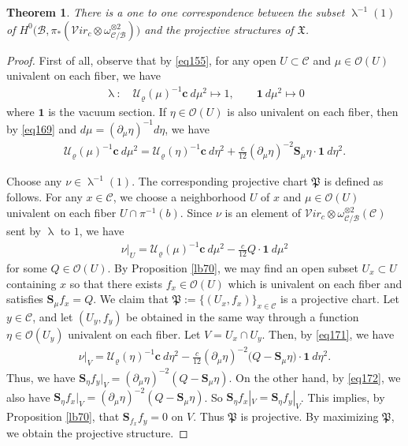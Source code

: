 \documentclass[12pt,a4paper,notitlepage]{report}
\theoremstyle{definition}
\theoremstyle{plain}
\newtheorem{thm}[df]{Theorem}
\newcommand{\fk}{\mathfrak}
\newcommand{\mc}{\mathcal}
\newcommand{\id}{\mathbf{1}}
\newcommand{\scr}{\mathscr}
\newcommand{\cbf}{\mathbf c}
\newcommand{\svir}{\mathcal V\!\mathit{ir}}
\newcommand{\Sbf}{\mathbf{S}}
\numberwithin{equation}{section}
\begin{document}
\begin{thm}\label{lb72}
There is a one to one correspondence between the subset $\uplambda^{-1}(1)$ of $H^0\big(\mc B,\pi_*(\svir_c\otimes \omega_{\mc C/\mc B}^{\otimes 2})\big)$ and  the projective structures of $\fk X$.
\end{thm}

\begin{proof}
First of all, observe that by \eqref{eq155}, for any open $U\subset \mc C$ and $\mu\in\scr O(U)$ univalent on each fiber, we have
\begin{gather*}
\uplambda:\quad \mc U_\varrho(\mu)^{-1}\cbf ~d\mu^2\mapsto 1,\qquad \id ~d\mu^2\mapsto 0
\end{gather*}
where $\id$ is the vacuum section. If $\eta\in\scr O(U)$ is also univalent on each fiber, then by \eqref{eq169} and $d\mu=(\partial_\mu\eta)^{-1} d\eta$, we have
\begin{align}
\mc U_\varrho(\mu)^{-1}\cbf~d\mu^2=\mc U_\varrho(\eta)^{-1}\cbf~d\eta^2+\frac {c}{12}(\partial_\mu\eta)^{-2}\Sbf_\mu\eta \cdot \id~d\eta^2.\label{eq171}
\end{align}


Choose any $\nu\in\uplambda^{-1}(1)$. The corresponding projective chart $\fk P$ is defined as follows. For any $x\in\mc C$, we choose a neighborhood $U$ of $x$ and  $\mu\in\scr O(U)$ univalent on each fiber $U\cap\pi^{-1}(b)$. Since $\nu$ is an element of $\svir_c\otimes \omega_{\mc C/\mc B}^{\otimes 2}(\mc C)$ sent by $\uplambda$ to $1$, we have
\begin{gather}
\nu|_U=\mc U_\varrho(\mu)^{-1}\cbf ~d\mu^2-\frac{c}{12}Q\cdot \id~d\mu^2 \label{eq173}
\end{gather} 
for some $Q\in\scr O(U)$. By Proposition \ref{lb70}, we may find an open subset $U_x\subset U$ containing $x$ so that there exists $f_x\in\scr O(U)$ which is univalent on each fiber and satisfies $\Sbf_\mu f_x=Q$. We claim that $\fk P:=\{(U_x,f_x)\}_{x\in\mc C}$ is a projective chart. Let $y\in \mc C$, and let $(U_y,f_y)$ be obtained in the same way through a function $\eta\in\scr O(U_y)$ univalent on each fiber. Let $V=U_x\cap U_y$. Then, by \eqref{eq171}, we have
\begin{gather*}
\nu|_V=\mc U_\varrho(\eta)^{-1}\cbf ~d\eta^2-\frac{c}{12}(\partial_\mu\eta)^{-2}\big(Q-\Sbf_\mu\eta\big)\cdot\id~d\eta^2.
\end{gather*}
Thus,  we have $\Sbf_\eta f_y|_V=(\partial_\mu\eta)^{-2}(Q-\Sbf_\mu\eta)$. On the other hand, by \eqref{eq172}, we also have $\Sbf_\eta f_x|_V=(\partial_\mu\eta)^{-2}(Q-\Sbf_\mu\eta)$. So $\Sbf_\eta f_x|_V=\Sbf_\eta f_y|_V$. This implies, by Proposition \ref{lb70}, that $\Sbf_{f_x}f_y=0$ on $V$. Thus $\fk P$ is projective. By maximizing $\fk P$, we obtain the projective structure.


\end{proof}
\end{document}
